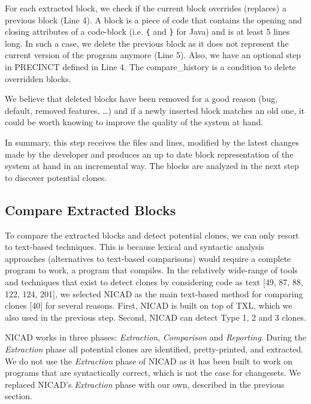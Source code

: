 \documentclass[12pt]{report}
\begin{document}
For each extracted block, we check if the current block overrides
(replaces) a previous block (Line 4). A block is a piece of code that
contains the opening and closing attributes of a code-block (i.e.
\lstinline!{! and \lstinline!}! for Java) and is at least 5 lines long.
In such a case, we delete the previous block as it does not represent
the current version of the program anymore (Line 5). Also, we have an
optional step in PRECINCT defined in Line 4. The compare\_history is a
condition to delete overridden blocks.

We believe that deleted blocks have been removed for a good reason (bug,
default, removed features, \ldots{}) and if a newly inserted block
matches an old one, it could be worth knowing to improve the quality of
the system at hand.

In summary, this step receives the files and lines, modified by the
latest changes made by the developer and produces an up to date block
representation of the system at hand in an incremental way. The blocks
are analyzed in the next step to discover potential clones.



\subsection{Compare Extracted Blocks}\label{compare-extracted-blocks}

To compare the extracted blocks and detect potential clones, we can only
resort to text-based techniques. This is because lexical and syntactic
analysis approaches (alternatives to text-based comparisons) would
require a complete program to work, a program that compiles. In the
relatively wide-range of tools and techniques that exist to detect
clones by considering code as text {[}49, 87, 88, 122, 124, 201{]}, we
selected NICAD as the main text-based method for comparing clones
{[}40{]} for several reasons. First, NICAD is built on top of TXL, which
we also used in the previous step. Second, NICAD can detect Type 1, 2
and 3 clones.

NICAD works in three phases: \emph{Extraction}, \emph{Comparison} and
\emph{Reporting}. During the \emph{Extraction} phase all potential
clones are identified, pretty-printed, and extracted. We do not use the
\emph{Extraction} phase of NICAD as it has been built to work on
programs that are syntactically correct, which is not the case for
changesets. We replaced NICAD's \emph{Extraction} phase with our own,
described in the previous section.
\end{document}
